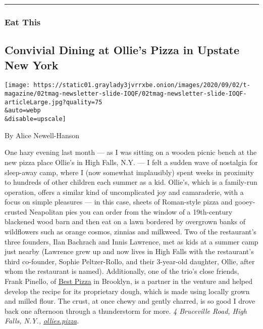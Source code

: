 \begin{center}\rule{0.5\linewidth}{\linethickness}\end{center}

\hypertarget{eat-this}{%
\subsubsection{Eat This}\label{eat-this}}

\hypertarget{convivial-dining-at-ollies-pizza-in-upstate-new-york}{%
\subsection{Convivial Dining at Ollie's Pizza in Upstate New
York}\label{convivial-dining-at-ollies-pizza-in-upstate-new-york}}

\texttt{[image: https://static01.graylady3jvrrxbe.onion/images/2020/09/02/t-magazine/02tmag-newsletter-slide-IOQF/02tmag-newsletter-slide-IOQF-articleLarge.jpg?quality=75\\\&auto=webp\\\&disable=upscale]}

By Alice Newell-Hanson

One hazy evening last month --- as I was sitting on a wooden picnic
bench at the new pizza place Ollie's in High Falls, N.Y. --- I felt a
sudden wave of nostalgia for sleep-away camp, where I (now somewhat
implausibly) spent weeks in proximity to hundreds of other children each
summer as a kid. Ollie's, which is a family-run operation, offers a
similar kind of uncomplicated joy and camaraderie, with a focus on
simple pleasures --- in this case, sheets of Roman-style pizza and
gooey-crusted Neapolitan pies you can order from the window of a
19th-century blackened wood barn and then eat on a lawn bordered by
overgrown banks of wildflowers such as orange cosmos, zinnias and
milkweed. Two of the restaurant's three founders, Ilan Bachrach and
Innis Lawrence, met as kids at a summer camp just nearby (Lawrence grew
up and now lives in High Falls with the restaurant's third co-founder,
Sophie Peltzer-Rollo, and their 3-year-old daughter, Ollie, after whom
the restaurant is named). Additionally, one of the trio's close friends,
Frank Pinello, of
\href{https://www.nytimes3xbfgragh.onion/2011/03/09/dining/reviews/09under.html}{Best
Pizza} in Brooklyn, is a partner in the venture and helped develop the
recipe for its proprietary dough, which is made using locally grown and
milled flour. The crust, at once chewy and gently charred, is so good I
drove back one afternoon through a thunderstorm for more. \emph{4
Bruceville Road, High Falls, N.Y.,}
\href{https://www.ollies.pizza/}{\emph{ollies.pizza}}\emph{.}

